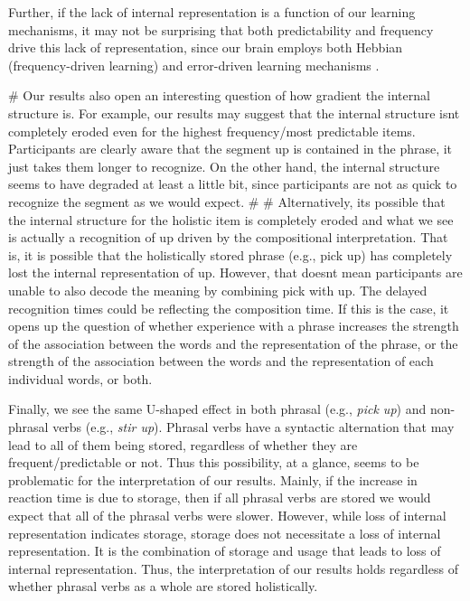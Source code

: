 \documentclass[
  authoryear,
  preprint,
  1p,
  onecolumn]{elsarticle}
\newenvironment{Shaded}{\begin{snugshade}}{\end{snugshade}}
\newcommand{\CommentTok}[1]{\textcolor[rgb]{0.37,0.37,0.37}{#1}}
\begin{document}
Further, if the lack of internal representation is a function of our
learning mechanisms, it may not be surprising that both predictability
and frequency drive this lack of representation, since our brain employs
both Hebbian (frequency-driven learning) and error-driven learning
mechanisms \citep[i.e., predictability-driven
learning,][]{ashby2007, kapatsinski2018}.

\begin{Shaded}
\begin{Highlighting}[]
\CommentTok{\# Our results also open an interesting question of how gradient the internal structure is. For example, our results may suggest that the internal structure isn\textquotesingle{}t completely eroded even for the highest frequency/most predictable items. Participants are clearly aware that the segment up is contained in the phrase, it just takes them longer to recognize. On the other hand, the internal structure seems to have degraded at least a little bit, since participants are not as quick to recognize the segment as we would expect. }
\CommentTok{\# }
\CommentTok{\# Alternatively, it\textquotesingle{}s possible that the internal structure for the holistic item is completely eroded and what we see is actually a recognition of up driven by the compositional interpretation. That is, it is possible that the holistically stored phrase (e.g., pick up) has completely lost the internal representation of up. However, that doesn\textquotesingle{}t mean participants are unable to also decode the meaning by combining pick with up. The delayed recognition times could be reflecting the composition time. If this is the case, it opens up the question of whether experience with a phrase increases the strength of the association between the words and the representation of the phrase, or the strength of the association between the words and the representation of each individual words, or both.}
\end{Highlighting}
\end{Shaded}

Finally, we see the same U-shaped effect in both phrasal (e.g.,
\emph{pick up}) and non-phrasal verbs (e.g., \emph{stir up}). Phrasal
verbs have a syntactic alternation that may lead to all of them being
stored, regardless of whether they are frequent/predictable or not. Thus
this possibility, at a glance, seems to be problematic for the
interpretation of our results. Mainly, if the increase in reaction time
is due to storage, then if all phrasal verbs are stored we would expect
that all of the phrasal verbs were slower. However, while loss of
internal representation indicates storage, storage does not necessitate
a loss of internal representation. It is the combination of storage and
usage that leads to loss of internal representation. Thus, the
interpretation of our results holds regardless of whether phrasal verbs
as a whole are stored holistically.
\end{document}
